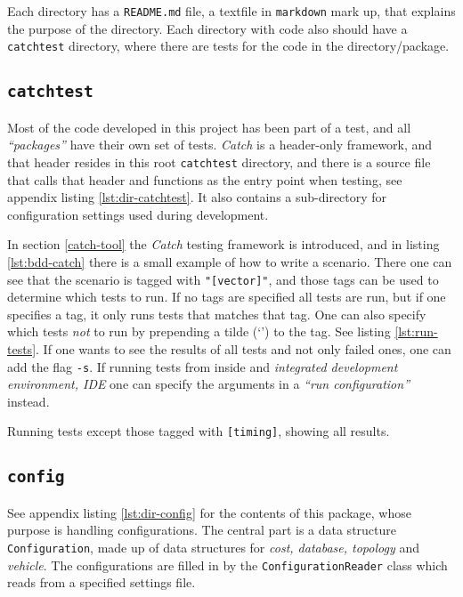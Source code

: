 \documentclass[../main.tex]{subfiles}
\begin{document}
Each directory has a \texttt{README.md} file, a textfile in \texttt{markdown} mark up, that explains the purpose of the directory. Each directory with code also should have a \texttt{catchtest} directory, where there are tests for the code in the directory/package.

\subsection{\texttt{catchtest}}
Most of the code developed in this project has been part of a test, and all \textit{``packages''} have their own set of tests. \textit{Catch} is a header-only framework, and that header resides in this root \texttt{catchtest} directory, and there is a source file that calls that header and functions as the entry point when testing, see appendix listing \ref{lst:dir-catchtest}. It also contains a sub-directory for configuration settings used during development.

In section \ref{catch-tool} the \textit{Catch} testing framework is introduced, and in listing \ref{lst:bdd-catch} there is a small example of how to write a scenario. There one can see that the scenario is tagged with \texttt{"[vector]"}, and those tags can be used to determine which tests to run. If no tags are specified all tests are run, but if one specifies a tag, it only runs tests that matches that tag. One can also specify which tests \textit{not} to run by prepending a tilde (`\mytilde') to the tag. See listing \ref{lst:run-tests}. If one wants to see the results of all tests and not only failed ones, one can add the flag \texttt{-s}. If running tests from inside and \textit{integrated development environment, IDE} one can specify the arguments in a \textit{``run configuration''} instead.

\begin{mylisting}
\caption{Running tests except those tagged with \texttt{[timing]}, showing all results.}
\label{lst:run-tests}
\end{mylisting}

\subsection{\texttt{config}}
See appendix listing \ref{lst:dir-config} for the contents of this package, whose purpose is handling configurations. The central part is a data structure \texttt{Configuration}, made up of data structures for \textit{cost, database, topology} and \textit{vehicle}. The configurations are filled in by the \texttt{ConfigurationReader} class which reads from a specified settings file.
\end{document}
